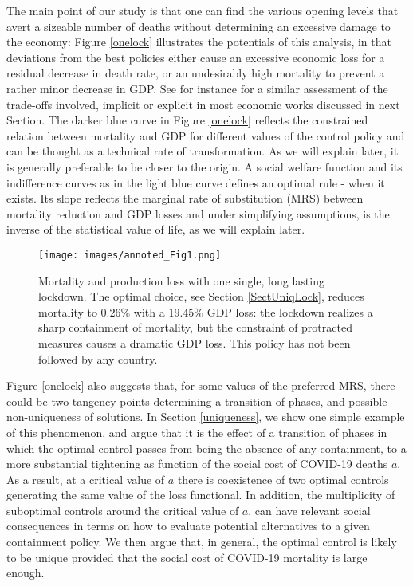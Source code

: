 \documentclass{amsart}
\begin{document}
The main point of our study is that one can 
find the various opening levels that avert a sizeable number
of deaths without determining an excessive damage to the economy:
Figure \ref{onelock} illustrates the potentials of
this analysis, in that deviations from the best
policies either cause an excessive economic loss for
a residual decrease in death rate, 
or an undesirably high mortality to prevent a rather
minor decrease in GDP. See for instance \cite{kaplan2020pandemics} for a similar assessment of the trade-offs involved, implicit or explicit in most economic works discussed in next Section. The darker blue curve in Figure \ref{onelock} reflects the constrained relation between mortality and GDP for different values of the control policy and can be thought as a technical rate of transformation. As we will explain later, it is generally preferable to be closer to the origin. A social welfare function and its indifference curves as in the light blue curve defines an optimal rule - when it exists. Its slope reflects the marginal rate of substitution (MRS) between mortality reduction and GDP losses and under simplifying assumptions, is the inverse of the statistical value of life, as we will explain later.\color{black}

 \vspace{0.4cm}
\begin{figure}[h!] \label{onelock}
    \centering
\texttt{[image: images/annoted\_Fig1.png]}
    \caption{ Mortality  and production loss with one single, long lasting lockdown. The optimal choice,
    see Section \ref{SectUniqLock}, reduces mortality to $0.26\%$
    with a $19.45\%$ GDP loss: 
    the lockdown realizes a sharp containment of
mortality, but the constraint of protracted measures
causes a dramatic GDP loss.
This policy has not been followed
    by any country.}
    \label{DeathProductionLoss}
\end{figure}


  Figure \ref{onelock} also suggests that, for some values  of the preferred MRS, there could be two tangency points determining a  transition of phases, and possible non-uniqueness of solutions.
In Section \ref{uniqueness}, we show one simple example of this phenomenon, and
argue that it is the effect of a transition of phases in 
which the optimal control passes from being the
absence of any containment, to a more substantial 
tightening
as function of the social cost of COVID-19 deaths $a$.
As a result, at a critical value of $a$
there is coexistence of two optimal controls 
generating the same  value of the loss functional.
In addition, the multiplicity of suboptimal
controls around the critical value of $a$,
can have relevant social consequences
in terms on how to evaluate potential alternatives
to a given containment policy.
We then argue that, in general, the optimal control is likely to be unique provided that the 
social cost of COVID-19
mortality is large enough.
\color{black}
\end{document}
